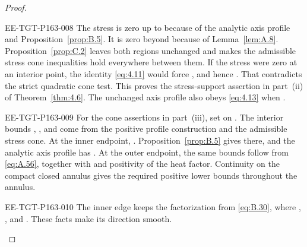 \begin{proof}
\begin{EESegment}{EE-TGT-P163-008}
The stress is zero up to  because of the analytic axis profile
and Proposition~\ref{prop:B.5}. It is zero beyond  because of
Lemma~\ref{lem:A.8}. Proposition~\ref{prop:C.2} leaves both regions unchanged and makes
the admissible stress cone inequalities hold everywhere between them. If the
stress were zero at an interior point, the identity \eqref{eq:4.11} would force
, and hence
. That contradicts the strict quadratic cone test. This
proves the stress-support assertion in part~\textup{(ii)} of
Theorem~\ref{thm:4.6}. The unchanged axis profile also obeys \eqref{eq:4.13}
when .
\end{EESegment}

\begin{EESegment}{EE-TGT-P163-009}
For the cone assertions in part~\textup{(iii)}, set
 on
. The interior bounds
, , and
 come from the positive profile
construction and the admissible stress cone. At the inner endpoint,
. Proposition~\ref{prop:B.5} gives
 there, and the analytic axis profile has
. At the outer endpoint, the same bounds follow from
\eqref{eq:A.56}, together with  and positivity of the heat
factor. Continuity on the compact closed annulus gives the required positive lower bounds throughout the annulus.
\end{EESegment}

\begin{EESegment}{EE-TGT-P163-010}
The inner edge keeps the factorization
 from \eqref{eq:B.30}, where
,
, and
. These facts make its direction
smooth.
\end{EESegment}


\end{proof}
